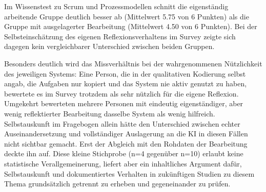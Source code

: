 Im Wissenstest zu Scrum und Prozessmodellen schnitt die eigenständig arbeitende Gruppe deutlich besser
ab (Mittelwert 5.75 von 6 Punkten) als die Gruppe mit ausgelagerter Bearbeitung (Mittelwert 4.50 von 6
Punkten). Bei der Selbsteinschätzung des eigenen Reflexionsverhaltens im Survey zeigte sich dagegen
kein vergleichbarer Unterschied zwischen beiden Gruppen.

Besonders deutlich wird das Missverhältnis bei der wahrgenommenen Nützlichkeit des jeweiligen
Systems: Eine Person, die in der qualitativen Kodierung selbst angab, die Aufgaben nur kopiert und das
System nie aktiv genutzt zu haben, bewertete es im Survey trotzdem als sehr nützlich für die eigene
Reflexion. Umgekehrt bewerteten mehrere Personen mit eindeutig eigenständiger, aber wenig reflektierter
Bearbeitung dasselbe System als wenig hilfreich. Selbstauskunft im Fragebogen allein hätte den
Unterschied zwischen echter Auseinandersetzung und vollständiger Auslagerung an die KI in diesen
Fällen nicht sichtbar gemacht. Erst der Abgleich mit den Rohdaten der Bearbeitung deckte ihn auf. Diese
kleine Stichprobe (n=4 gegenüber n=10) erlaubt keine statistische Verallgemeinerung, liefert aber ein
inhaltliches Argument dafür, Selbstauskunft und dokumentiertes Verhalten in zukünftigen Studien zu
diesem Thema grundsätzlich getrennt zu erheben und gegeneinander zu prüfen.
